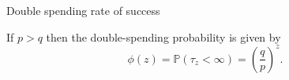\documentclass{beamer}
\begin{document}
\begin{frame}{Double spending rate of success}
\begin{tikzpicture}
\end{tikzpicture}
\begin{tcolorbox}[enhanced,drop shadow, title=Double spending theorem]
If $p>q$ then the double-spending probability is given by
$$
\phi(z) = \mathbb{P}(\tau_z<\infty)=\left(\frac{q}{p}\right)^{z}.
$$
\end{tcolorbox}

\end{frame}
\end{document}
